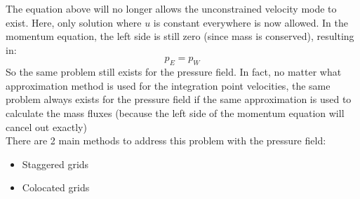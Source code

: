 \documentclass[11pt]{article}
\begin{document}
The equation above will no longer allows the unconstrained velocity mode to exist. Here, only solution where \(u\) is constant everywhere is now allowed. In the momentum equation, the left side
is still zero (since mass is conserved), resulting in:
\begin{equation*}
\boxed{p_E = p_W}
\end{equation*}
So the same problem still exists for the pressure field. In fact, no matter what approximation method is used for
the integration point velocities, the same problem always exists for the pressure field if the same approximation
is used to calculate the mass fluxes (because the left side of the momentum equation will cancel out exactly)\\
There are 2 main methods to address this problem with the pressure field:
\begin{itemize}
\item Staggered grids
\item Colocated grids
\end{itemize}
\end{document}
